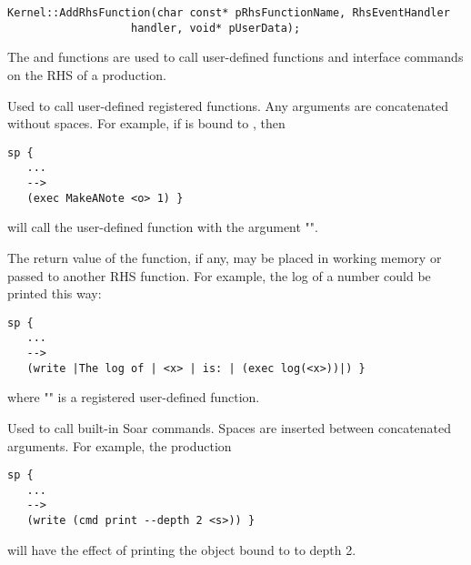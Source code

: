 \begin{verbatim}
Kernel::AddRhsFunction(char const* pRhsFunctionName, RhsEventHandler 
                   handler, void* pUserData);
\end{verbatim}

The  and  functions are used to call user-defined functions and interface
commands on the RHS of a production.

\begin{description}
\item [\soarb{exec} --- ] Used to call user-defined registered functions. Any arguments are concatenated
without spaces. For example, if  is bound to , then

\begin{verbatim}
sp {
   ...
   -->
   (exec MakeANote <o> 1) }
\end{verbatim}
   
will call the user-defined  function with the argument "".

The return value of the function, if any, may be placed in working memory or passed
to another RHS function. For example, the log of a number  could be printed this way:

\begin{verbatim}
sp {
   ...
   -->
   (write |The log of | <x> | is: | (exec log(<x>))|) }
\end{verbatim}

where "" is a registered user-defined function.

\item[\soarb{cmd} --- ] Used to call built-in Soar commands. Spaces are inserted between concatenated 
arguments. For example, the production

\begin{verbatim}
sp {
   ...
   -->
   (write (cmd print --depth 2 <s>)) }
\end{verbatim}

will have the effect of printing the object bound to  to depth 2.
\end{description}


